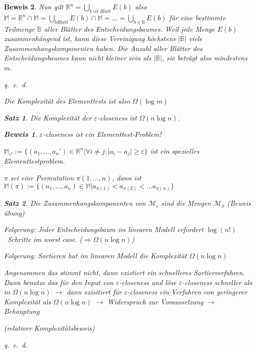 \documentclass[ngerman,draft,parskip=half*,twoside]{scrreprt}
\theoremstyle{break}
\newtheorem{beweis}{Beweis}
\newtheorem{satz}{Satz}
\begin{document}
\begin{beweis}
Nun  gilt \(\mathbb{R}^n = \bigcup_{b \ ist\ Blatt} E(b)\) also
\( \mathbb{M} = \mathbb{R}^n \cap \mathbb{M} = \bigcup_{b   Blatt} E(b) \cap \mathbb{M} = \dots = \bigcup_{b \in \mathbb{B}} E(b) \)
für eine bestimmte Teilmenge $\mathbb{B}$ aller Blätter des Entscheidungsbaumes. Weil jede Menge $E(b)$ zusammenhängend ist, kann
diese Vereinigung höchstens $\vert\mathbb{B}\vert$ viele Zusammenhangskomponenten haben. Die Anzahl aller Blätter des
Entscheidungsbaumes kann nicht kleiner sein als $\vert\mathbb{B}\vert$, sie beträgt also mindestens $m$.

\hfill q.~e.~d. 

Die Komplexität des Elementtests ist also \( \Omega (\log m) \)	
  \begin{satz}
  Die Komplexität der $\varepsilon$-closeness ist \( \Omega (n \log n) \).
  \end{satz}

  \begin{beweis}
  $\varepsilon$-closeness ist ein Elementtest-Problem!

  \( \mathbb{M}_{\varepsilon^i} := \lbrace ( a_1, \dots , a_n ') \in \mathbb{R}^n \vert \forall   i \ne j : \vert a_i - a_j 
  \vert \geq \varepsilon \rbrace\) ist ein spezielles Elementtestproblem.
				
  $\pi$ sei eine Permutation \( \pi(1, \dots ,n) \), dann ist
  \( \mathbb{M}(\pi ) := \lbrace (a_1, \dots , a_n) \in \mathbb{M} \vert a_{\pi (1)} < a_{\pi (2)} < \dots a_{\pi (n)}  \rbrace \)
	
	
  \begin{satz} 
  Die Zusammenhangskomponenten von \( \mathcal{M}_\varepsilon \) sind die Mengen \( \mathcal{M}_\pi  \) (\textup{Beweis übung})
  \end{satz}		
		
  \textit{Folgerung: Jeder Entscheidungsbaum im linearen Modell erfordert $\log (n!)$~Schritte im worst case. 
  ($\Rightarrow \Omega (n \log n)$)}
		
  \end{beweis}	
\textit{Folgerung: Sortieren hat im linearen Modell die Komplexität $\Omega (n \log n)$}
	
Angenommen das stimmt nicht, dann existiert ein schnelleres Sortierverfahren. 
Dann benutze das für den Input von $\varepsilon$-closeness und löse $\varepsilon$-closeness schneller als in \( \Omega (n \log n)\)
\( \rightarrow \) dann exisitiert für $\varepsilon$-closeness ein Verfahren von geringerer Komplexität als \( \Omega (n \log n) \)
\( \rightarrow \) Widerspruch zur Voraussetzung \( \rightarrow \) Behauptung
		
(relativer Komplexitätsbeweis)

\hfill q.~e.~d.
\end{beweis}
\end{document}
